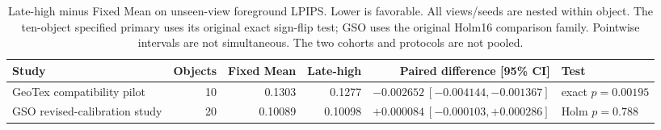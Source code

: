 \documentclass[times,twocolumn,final]{elsarticle}
\providecommand{\DIFaddbegin}{} %
\providecommand{\DIFaddend}{} %
\providecommand{\DIFdelbegin}{} %
\providecommand{\DIFdelend}{} %
\begin{document}
\DIFdelbegin %
\DIFdelend \DIFaddbegin \begin{table}[t]\centering\scriptsize\setlength{\tabcolsep}{4pt}
\caption{Late-high minus Fixed Mean on unseen-view foreground LPIPS. Lower is favorable. All views/seeds are nested within object. The ten-object specified primary uses its original exact sign-flip test; GSO uses the original Holm16 comparison family. Pointwise intervals are not simultaneous. The two cohorts and protocols are not pooled.}
\label{tab:bake-cohorts}
\begin{tabular}{lrrrrl}
\toprule Study & Objects & Fixed Mean & Late-high & Paired difference [95\% CI] & Test \\
\midrule
GeoTex compatibility pilot & 10 & 0.1303 & 0.1277 & $-0.002652\ [-0.004144,-0.001367]$ & exact $p=0.00195$ \\
GSO revised-calibration study & 20 & 0.10089 & 0.10098 & $+0.000084\ [-0.000103,+0.000286]$ & Holm $p=0.788$ \\
\bottomrule\end{tabular}\end{table}
\DIFaddend 
\end{document}
